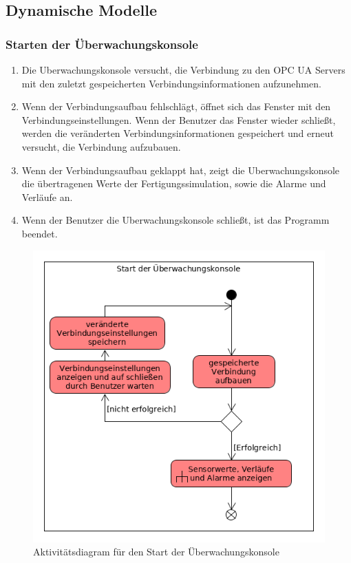 \documentclass[parskip=full]{scrartcl}
\begin{document}
\subsection{Dynamische Modelle}
\subsubsection{Starten der Überwachungskonsole}
\label{console-launch}
\begin{enumerate}[noitemsep]
 \item Die \gls{Uberwachungskonsole} versucht, die Verbindung zu den \glspl{OPC UA Server} mit den zuletzt gespeicherten Verbindungsinformationen aufzunehmen.
 \item Wenn der Verbindungsaufbau fehlschlägt, öffnet sich das Fenster mit den Verbindungseinstellungen. Wenn der Benutzer das Fenster wieder schließt,
 werden die veränderten Verbindungsinformationen gespeichert und erneut versucht, die Verbindung aufzubauen.
 \item Wenn der Verbindungsaufbau geklappt hat, zeigt die \gls{Uberwachungskonsole} die übertragenen Werte der \gls{Fertigungssimulation}, sowie die
 Alarme und Verläufe an.
 \item Wenn der Benutzer die \gls{Uberwachungskonsole} schließt, ist das Programm beendet.
\end{enumerate}
\begin{figure}[h!]
  \centering
  \includegraphics[scale=0.62]{media/Activities/launch-console.png}
  \caption{Aktivitätsdiagram für den Start der Überwachungskonsole}
\end{figure}
\end{document}
